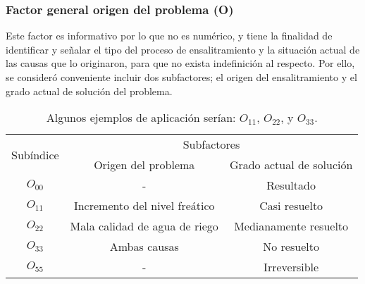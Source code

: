 \subsubsection{Factor general origen del problema (O)}
Este factor es informativo por lo que no es numérico, y tiene la finalidad de identificar y señalar el tipo del proceso de ensalitramiento y la situación actual de las causas que lo originaron, para que no exista indefinición al respecto. Por ello, se consideró conveniente incluir dos subfactores; el origen del ensalitramiento y el grado actual de solución del problema.
\begin{table}[h!]
    \centering
    \begin{tabular}{@{}ccc@{}}
    \toprule
    \multirow{2}{*}{Subíndice} & \multicolumn{2}{c}{Subfactores}                          \\ \cmidrule(l){2-3} 
                               & Origen del problema           & Grado actual de solución \\ \midrule
    $O_{00}$                   & -                             & Resultado                \\
    $O_{11}$                   & Incremento del nivel freático & Casi resuelto            \\
    $O_{22}$                   & Mala calidad de agua de riego & Medianamente resuelto    \\
    $O_{33}$                   & Ambas causas                  & No resuelto              \\
    $O_{55}$                   & -                             & Irreversible             \\ \bottomrule
    \end{tabular}
    \caption{Algunos ejemplos de aplicación serían: $O_{11}$, $O_{22}$, y $O_{33}$.}
    \label{tabs31}
\end{table}

